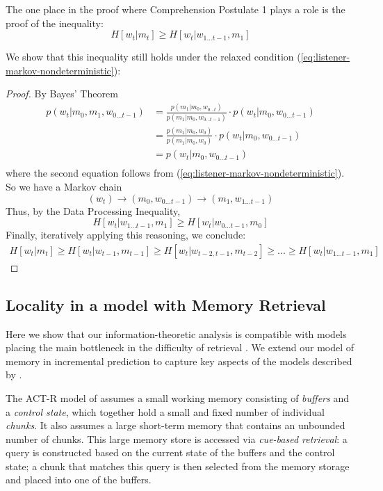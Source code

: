 \documentclass[11pt,letterpaper]{article}
\begin{document}
The one place in the proof where Comprehension Postulate 1 plays a role is the proof of the inequality:
\begin{equation}
	H[w_t | m_t] \geq H[w_t|w_{1 \dots t-1}, m_1]
\end{equation}

We show that this inequality still holds under the relaxed condition (\ref{eq:listener-markov-nondeterministic}):
\begin{proof}
	By Bayes' Theorem
\begin{align*}
	p(w_t|m_0, m_1, w_{0\dots t-1}) &= \frac{p(m_1|m_0, w_{0\dots t})}{p(m_1|m_0, w_{0\dots t-1})} \cdot p(w_t|m_0, w_{0\dots t-1}) \\
 &= \frac{p(m_1|m_0, w_{0})}{p(m_1|m_0, w_{0})} \cdot p(w_t|m_0, w_{0\dots t-1}) \\
 &= p(w_t|m_0, w_{0\dots t-1}) \\
\end{align*}
	where the second equation follows from (\ref{eq:listener-markov-nondeterministic}).
So we have a Markov chain
\begin{equation}
(w_t) \rightarrow (m_0, w_{0 \dots t-1})   \rightarrow   (m_1, w_{1 \dots t-1})
\end{equation}
Thus, by the Data Processing Inequality,
\begin{equation}
H[w_t| w_{1 \dots t-1}, m_{1}] \geq H[w_t|w_{0 \dots t-1}, m_0]
\end{equation}
Finally, iteratively applying this reasoning, we conclude:
\begin{align*}
H[w_t | m_t] \geq H[w_t| w_{t-1}, m_{t-1}] \geq H[w_t| w_{t-2, t-1}, m_{t-2}] \geq ... \geq H[w_t|w_{1 \dots t-1}, m_1]
\end{align*}
\end{proof}


\subsection{Locality in a model with Memory Retrieval}

Here we show that our information-theoretic analysis is compatible with models placing the main bottleneck in the difficulty of retrieval \citep{mcelree2000sentence,lewis-activation-based-2005,nicenboim2018models,vasishth2019computational}.
We extend our model of memory in incremental prediction to capture key aspects of the models described by \citet{lewis-activation-based-2005,nicenboim2018models,vasishth2019computational}.

The ACT-R model of \cite{lewis-activation-based-2005} assumes a small working memory consisting of \emph{buffers} and a \emph{control state}, which together hold a small and fixed number of individual \emph{chunks}.
It also assumes a large short-term memory that contains an unbounded number of chunks.
This large memory store is accessed via \emph{cue-based retrieval}: a query is constructed based on the current state of the buffers and the control state; a chunk that matches this query is then selected from the memory storage and placed into one of the buffers.
\end{document}
